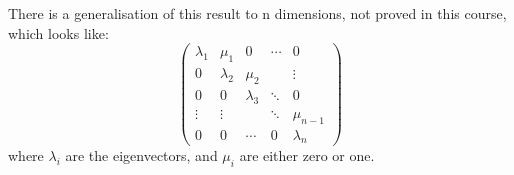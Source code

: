 \documentclass[../Main.tex]{subfiles}
\begin{document}
\begin{remark}
    There is a generalisation of this result to n dimensions, not proved in this course, which looks like:
    \begin{equation*}
        \begin{pmatrix}
            \lambda_1 & \mu_1 & 0 & \cdots & 0 \\
            0 & \lambda_2 & \mu_2 & & \vdots \\
            0 & 0 & \lambda_3 & \ddots & 0 \\
            \vdots & \vdots & & \ddots & \mu_{n-1} \\
            0 & 0 & \cdots & 0 & \lambda_n
        \end{pmatrix}
    \end{equation*}
    where $\lambda_i$ are the eigenvectors, and $\mu_i$ are either zero or one.
\end{remark}
\end{document}
